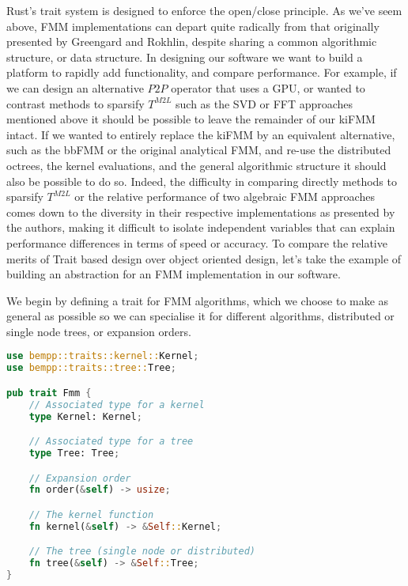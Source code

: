 Rust's trait system is designed to enforce the open/close principle. As we've seem above, FMM implementations can depart quite radically from that originally presented by Greengard and Rokhlin, despite sharing a common algorithmic structure, or data structure. In designing our software we want to build a platform to rapidly add functionality, and compare performance. For example, if we can design an alternative $P2P$ operator that uses a GPU, or wanted to contrast methods to sparsify $T^{M2L}$ such as the SVD or FFT approaches mentioned above it should be possible to leave the remainder of our kiFMM intact. If we wanted to entirely replace the kiFMM by an equivalent alternative, such as the bbFMM or the original analytical FMM, and re-use the distributed octrees, the kernel evaluations, and the general algorithmic structure it should also be possible to do so. Indeed, the difficulty in comparing directly methods to sparsify $T^{M2L}$ or the relative performance of two algebraic FMM approaches comes down to the diversity in their respective implementations as presented by the authors, making it difficult to isolate independent variables that can explain performance differences in terms of speed or accuracy. To compare the relative merits of Trait based design over object oriented design, let's take the example of building an abstraction for an FMM implementation in our software.

We begin by defining a trait for FMM algorithms, which we choose to make as general as possible so we can specialise it for different algorithms, distributed or single node trees, or expansion orders.

\begin{lstlisting}[language=Rust, caption={Traits for FMM Algorithms.},  label=code:chpt:2:sec:3:fmm]
use bempp::traits::kernel::Kernel;
use bempp::traits::tree::Tree;

pub trait Fmm {
    // Associated type for a kernel
    type Kernel: Kernel;

    // Associated type for a tree
    type Tree: Tree;

    // Expansion order
    fn order(&self) -> usize;

    // The kernel function
    fn kernel(&self) -> &Self::Kernel;

    // The tree (single node or distributed)
    fn tree(&self) -> &Self::Tree;
}
\end{lstlisting}

